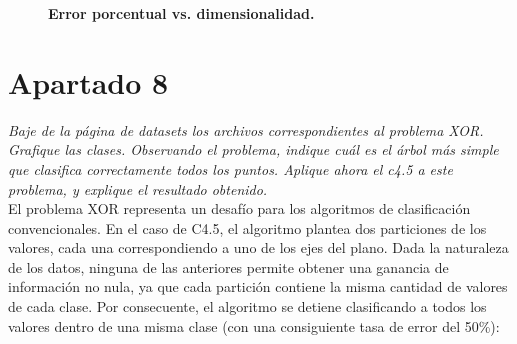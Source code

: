 \documentclass[a4paper, 11pt]{article} %
\begin{document}
\begin{figure}[H]
\captionsetup[subfigure]{labelformat=empty}
  \centering
  \caption*{\textbf{Error porcentual vs. dimensionalidad.}}
\end{figure}


\section*{Apartado 8} 
\textit{Baje de la página de datasets los archivos correspondientes al problema
XOR. Grafique las clases. Observando el problema, indique cuál es el árbol más
simple que clasifica correctamente todos los puntos. Aplique ahora el c4.5 a
este problema, y explique el resultado obtenido.}\\


El problema XOR representa un desafío para los algoritmos de clasificación
convencionales. En el caso de C4.5, el algoritmo plantea dos particiones de los
valores, cada una correspondiendo a uno de los ejes del plano. Dada la
naturaleza de los datos, ninguna de las anteriores permite obtener una ganancia
de información no nula, ya que cada partición contiene la misma cantidad de
valores de cada clase. Por consecuente, el algoritmo se detiene clasificando a
todos los valores dentro de una misma clase (con una consiguiente tasa de error
del 50\%):\\
\end{document}
